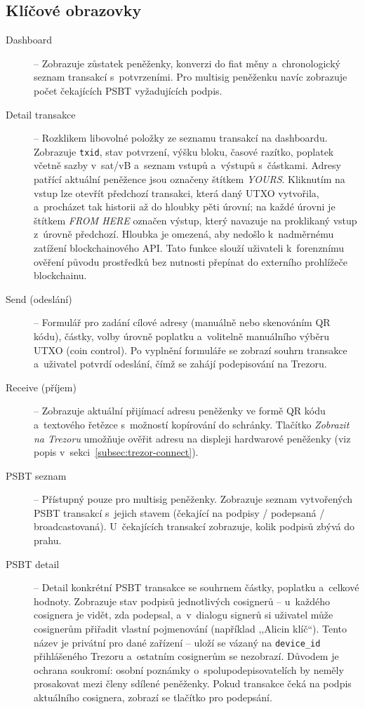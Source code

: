 \subsection{Klíčové obrazovky}

\begin{description}
\item[Dashboard] -- Zobrazuje zůstatek peněženky, konverzi do fiat měny
  a~chronologický seznam transakcí s~potvrzeními. Pro multisig peněženku
  navíc zobrazuje počet čekajících PSBT vyžadujících podpis.

\item[Detail transakce] -- Rozklikem libovolné položky ze seznamu
  transakcí na dashboardu. Zobrazuje \texttt{txid}, stav potvrzení, výšku
  bloku, časové razítko, poplatek včetně sazby v~sat/vB a~seznam vstupů
  a~výstupů s~částkami. Adresy patřící aktuální peněžence jsou označeny
  štítkem \emph{YOURS}. Kliknutím na vstup lze otevřít předchozí transakci,
  která daný UTXO vytvořila, a~procházet tak historii až do hloubky pěti
  úrovní; na každé úrovni je štítkem \emph{FROM HERE} označen výstup, který
  navazuje na proklikaný vstup z~úrovně předchozí. Hloubka je omezená,
  aby nedošlo k~nadměrnému zatížení blockchainového API. Tato funkce slouží
  uživateli k~forenznímu ověření původu prostředků bez nutnosti přepínat
  do externího prohlížeče blockchainu.

\item[Send (odeslání)] -- Formulář pro zadání cílové adresy (manuálně
  nebo skenováním QR kódu), částky, volby úrovně poplatku a~volitelně
  manuálního výběru UTXO (coin control). Po vyplnění formuláře se zobrazí
  souhrn transakce a~uživatel potvrdí odeslání, čímž se zahájí podepisování
  na Trezoru.

\item[Receive (příjem)] -- Zobrazuje aktuální přijímací adresu peněženky
  ve formě QR kódu a~textového řetězce s~možností kopírování do schránky.
  Tlačítko \emph{Zobrazit na Trezoru} umožňuje ověřit adresu na displeji
  hardwarové peněženky (viz popis v~sekci~\ref{subsec:trezor-connect}).

\item[PSBT seznam] -- Přístupný pouze pro multisig peněženky. Zobrazuje
  seznam vytvořených PSBT transakcí s~jejich stavem (čekající na podpisy /
  podepsaná / broadcastovaná). U~čekajících transakcí zobrazuje, kolik
  podpisů zbývá do prahu.

\item[PSBT detail] -- Detail konkrétní PSBT transakce se souhrnem částky,
  poplatku a~celkové hodnoty. Zobrazuje stav podpisů jednotlivých cosignerů --
  u~každého cosignera je vidět, zda podepsal, a~v~dialogu signerů si uživatel
  může cosignerům přiřadit vlastní pojmenování (například ,,Alicin klíč``).
  Tento název je privátní pro dané zařízení -- uloží se vázaný na
  \texttt{device\_id} přihlášeného Trezoru a~ostatním cosignerům se nezobrazí.
  Důvodem je ochrana soukromí: osobní poznámky o~spolupodepisovatelích by
  neměly prosakovat mezi členy sdílené peněženky. Pokud transakce čeká
  na podpis aktuálního cosignera, zobrazí se tlačítko pro podepsání.


\end{description}
